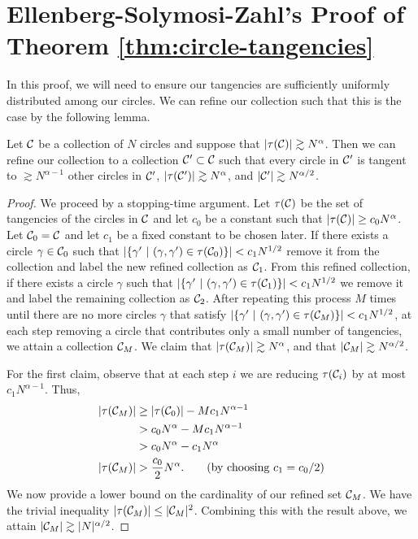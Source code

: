 \section[Ellenberg-Solymosi-Zahl's Proof]{Ellenberg-Solymosi-Zahl's Proof of Theorem \ref{thm:circle-tangencies} \label{sect:Zahl-Proof}}
In this proof, we will need to ensure our tangencies
are sufficiently uniformly distributed among our circles. We can refine our collection such that this is the case by the following lemma.

\begin{lemma}
    Let $\mathcal C$ be a collection of $N$ circles and suppose that $|\tau(\mathcal C)| \gtrsim N^{\alpha}$. 
    Then we can refine our collection to a collection $\mathcal C' \subset \mathcal C$ such that every circle in $\mathcal C'$ is tangent to $\gtrsim N^{\alpha -1}$ other circles in $\mathcal C'$, $|\tau(\mathcal C')| \gtrsim N^{\alpha}$, and $|\mathcal C'| \gtrsim N^{\alpha/2}$. \label{lem:uniform-refine}
\end{lemma}

\begin{proof}
We proceed by a stopping-time argument.
Let $\tau(\mathcal C)$ be the set of tangencies of the circles in $\mathcal C$ and let $c_0$ be a constant such that $|\tau(\mathcal C)| \geq c_0 N^{\alpha}$. Let $\mathcal C_0 = \mathcal C$ and let $c_1$ be a fixed constant to be chosen later. If there exists a circle $\gamma \in \mathcal C_0$ such that $|\{ \gamma' \ |\ (\gamma, \gamma') \in \tau(\mathcal C_0)\}| < c_1 N^{1/2}$
remove it from the collection and label the new refined collection as $\mathcal C_1$. From this refined collection, if there exists a circle $\gamma$ such that $|\{\gamma'\ |\ (\gamma, \gamma') \in \tau(\mathcal C_1)\}| < c_1 N^{1/2}$ we remove it and label the remaining collection as $\mathcal C_2$.
After repeating this process $M$ times until there are no more circles $\gamma$ that satisfy $|\{\gamma'\ |\ (\gamma, \gamma') \in \tau(\mathcal C_M)\}| < c_1 N^{1/2}$, at each step removing a circle that contributes only a small number of tangencies, we attain a collection $\mathcal C_M$.
 We claim that $|\tau(\mathcal C_M)| \gtrsim N^{\alpha}$, and that $|\mathcal C_M| \gtrsim N^{\alpha/2}$.

For the first claim, observe that at each step $i$ we are reducing $\tau(\mathcal C_i)$ by at most $c_1 N^{\alpha -1}$.  Thus,
\begin{align*}
    |\tau(\mathcal C_M)| &\geq |\tau(\mathcal C_0)| - M c_1 N^{\alpha -1} \\
    &> c_0 N^{\alpha} -  M c_1 N^{\alpha -1} \\ 
    &> c_0 N^{\alpha} - c_1 N^{\alpha} \\
    |\tau(\mathcal C_M)| &> \frac{c_0}{2} N^{\alpha}. \qquad (\text{by choosing } c_1 = c_0/2 )
\end{align*}
We now provide a lower bound on the cardinality of our refined set $\mathcal C_M$. We have the trivial inequality $|\tau(\mathcal C_M)| \leq |\mathcal C_M|^{2}$. 
Combining this with the result above, we attain $|\mathcal C_M| \gtrsim |N|^{\alpha/2}$.
\end{proof}

